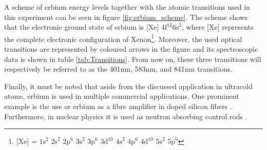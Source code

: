 A scheme of erbium energy levels together with the atomic transitions used in this experiment can be seen in figure \ref{fig:erbium_scheme}. The scheme shows that the electronic ground state of erbium is $\text{[Xe] }\text{4f}^{12} \text{6s}^2$, where [Xe]
represents the complete electronic configuration of Xenon\footnote{$\text{[Xe] = }\text{1s}^2 \text{ 2s}^2 \text{ 2p}^6 \text{ 3s}^2 \text{ 3p}^6 \text{ 3d}^{10} \text{ 4s}^2 \text{ 4p}^6 \text{ 4d}^{10} \text{ 5s}^2 \text{ 5p}^6$}. Moreover, the used optical transitions are represented by coloured arrows in the figure and its spectroscopic data is shown in table \ref{tab:Transitions}. From now on, these three transitions will respectively be referred to as the 401nm, 583nm, and 841nm transitions.

Finally, it must be noted that aside from the discussed application in ultracold atoms, erbium is used in multiple commercial applications. One prominent example is the use or erbium as a fibre amplifier in doped silicon fibers \cite{mears1987low}. Furthermore, in nuclear physics it is used as neutron absorbing control rods \cite{emsley2011nature}.


